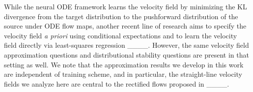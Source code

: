 While the neural ODE framework learns the velocity field by minimizing the KL divergence from the target distribution to the pushforward distribution of the source under ODE flow maps, another recent line of research  aims to specify the velocity field \textit{a priori} using conditional expectations and to learn the velocity field directly via least-squares regression ____. However, the same velocity field approximation questions and distributional stability questions are present in that setting as well. We note that the approximation results we develop in this work are independent of training scheme, and in particular, the straight-line velocity fields we analyze here are central to the rectified flows proposed in ____. 



    




        
